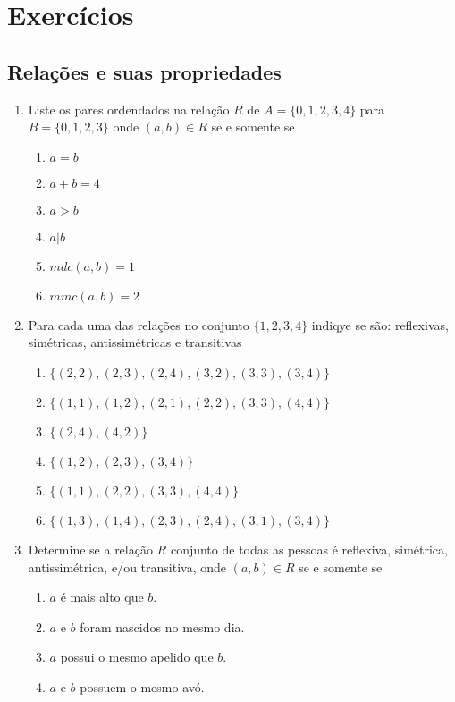 \chapter*{Exercícios}

\section*{Relações e suas propriedades}

\begin{enumerate}
  	\item {Liste os pares ordendados na relação $R$ de $A = \{0,1,2,3,4\}$ para $B = \{0,1,2,3\}$ onde $(a,b) \in R$ se
  	e somente se}
  	\begin{enumerate}
  	  	\item $a = b$ \item $a + b = 4$ \item $a > b$ \item $a | b$ \item $mdc(a,b)=1$ \item $mmc(a,b)=2$
  	\end{enumerate}
  	
  	\item{Para cada uma das relações no conjunto $\{1,2,3,4\}$ indiqye se são: reflexivas, simétricas, antissimétricas
  	e transitivas}
  	\begin{enumerate}
  	  	\item $\{(2, 2), (2, 3), (2, 4), (3, 2), (3, 3), (3, 4)\}$
  	  	\item $\{(1, 1), (1, 2), (2, 1), (2, 2), (3, 3), (4, 4)\}$
  	  	\item $\{(2, 4), (4, 2)\}$
  	  	\item $\{(1, 2), (2, 3), (3, 4)\}$
  	  	\item $\{(1, 1), (2, 2), (3, 3), (4, 4)\}$
  	  	\item $\{(1, 3), (1, 4), (2, 3), (2, 4), (3, 1), (3, 4)\}$
  	\end{enumerate}

  	\item {Determine se a relação $R$ conjunto de todas as pessoas é reflexiva, simétrica, antissimétrica, e/ou
  	transitiva, onde $(a,b) \in R$ se e somente se}
  	\begin{enumerate}
  		\item $a$ é mais alto que $b$.
  		\item $a$ e $b$ foram nascidos no mesmo dia.
  		\item $a$ possui o mesmo apelido que $b$.
  		\item $a$ e $b$ possuem o mesmo avó.
  	\end{enumerate}	
\end{enumerate}



\vspace*{2em}